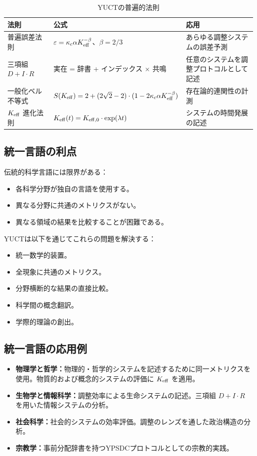 \documentclass[11pt,a4paper]{article}
\begin{document}
	\begin{table}[H]
		\centering
		\caption{YUCTの普遍的法則}
		\label{tab:universal-laws}
		\begin{tabular}{p{5cm}p{6cm}p{5cm}}
			\toprule
			\textbf{法則} & \textbf{公式} & \textbf{応用} \\
			\midrule
			普遍誤差法則 & \(\varepsilon = \kappa_c \alpha \Keff^{-\beta}\)、\(\beta = 2/3\) & あらゆる調整システムの誤差予測 \\
			三項組 \(D + I \cdot R\) & 実在 = 辞書 + インデックス × 共鳴 & 任意のシステムを調整プロトコルとして記述 \\
			一般化ベル不等式 & \(S(\Keff) = 2 + (2\sqrt{2}-2)\cdot(1 - 2\kappa_c \alpha \Keff^{-\beta})\) & 存在論的連関性の計測 \\
			\(\Keff\) 進化法則 & \(\Keff(t) = \Keff[0] \cdot \exp(\lambda t)\) & システムの時間発展の記述 \\
			\bottomrule
		\end{tabular}
	\end{table}
	
	\subsection{統一言語の利点}
	
	伝統的科学言語には限界がある：
	\begin{itemize}
		\item 各科学分野が独自の言語を使用する。
		\item 異なる分野に共通のメトリクスがない。
		\item 異なる領域の結果を比較することが困難である。
	\end{itemize}
	
	YUCTは以下を通じてこれらの問題を解決する：
	\begin{itemize}
		\item 統一数学的装置。
		\item 全現象に共通のメトリクス。
		\item 分野横断的な結果の直接比較。
		\item 科学間の概念翻訳。
		\item 学際的理論の創出。
	\end{itemize}
	
	\subsection{統一言語の応用例}
	
	\begin{itemize}
		\item \textbf{物理学と哲学：}物理的・哲学的システムを記述するために同一メトリクスを使用。物質的および概念的システムの評価に \(\Keff\) を適用。
		\item \textbf{生物学と情報科学：}調整効率による生命システムの記述。三項組 \(D + I \cdot R\) を用いた情報システムの分析。
		\item \textbf{社会科学：}社会的システムの効率評価。調整のレンズを通した政治構造の分析。
		\item \textbf{宗教学：}事前分配辞書を持つYPSDCプロトコルとしての宗教的実践。
	\end{itemize}
	
\end{document}
